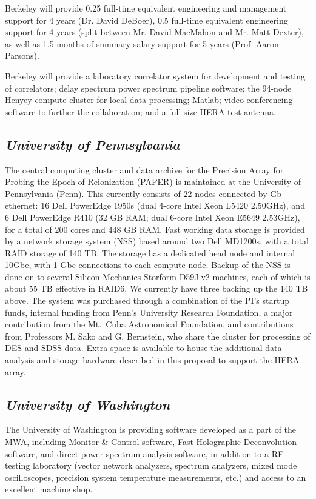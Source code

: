 \documentclass[11pt]{article}
\begin{document}
Berkeley will provide 0.25 full-time equivalent engineering and management support for 4 years (Dr. David DeBoer), 0.5 full-time equivalent engineering support for 4 years (split between Mr. 
David MacMahon and Mr. Matt Dexter), as well as 1.5 months of summary salary support for 5 years (Prof. Aaron Parsons).

Berkeley will provide a laboratory correlator system for development and testing of correlators; delay spectrum power spectrum pipeline software; 
the 94-node Henyey compute cluster for local data processing; Matlab; video conferencing software to further the collaboration; and a full-size 
HERA test antenna.

\subsection*{\it University of Pennsylvania}

The central computing cluster and data archive for the Precision Array for Probing the Epoch of Reionization (PAPER) is maintained at the University of Pennsylvania (Penn).  This currently consists of 22 nodes connected by Gb ethernet: 16 Dell PowerEdge 1950s (dual 4-core Intel Xeon L5420 \@ 2.50GHz), and 6 Dell PowerEdge R410 (32 GB RAM; dual 6-core Intel Xeon E5649 \@ 2.53GHz), for a total of 200 cores and 448 GB RAM.  Fast working data storage is provided by a network storage system (NSS) based around two Dell MD1200s, with a total RAID storage of 140 TB.  The storage has a dedicated head node and internal 10Gbe, with 1 Gbe connections to each compute node. Backup of the NSS is done on to several Silicon Mechanics Storform D59J.v2 machines, each of which is about 55 TB effective in RAID6.  We currently have three backing up the 140 TB above. The system was purchased through a combination of the PI's startup funds, internal funding from Penn's University Research Foundation, a major contribution from the Mt.~Cuba Astronomical Foundation, and contributions from Professors M. Sako and G. Bernstein, who share the cluster for processing of DES and SDSS data.  Extra space is available to house the additional data analysis and storage hardware described in this proposal to support the HERA array.


\subsection*{\it University of Washington}

The University of Washington is providing software developed as a part of the MWA, including Monitor \& Control software, Fast Holographic Deconvolution software, and direct power spectrum analysis software, in addition to a RF testing laboratory (vector network analyzers, spectrum analyzers, mixed mode oscilloscopes, precision system temperature measurements, etc.) and access to an excellent machine shop.
\end{document}
